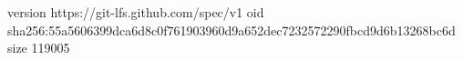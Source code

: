 version https://git-lfs.github.com/spec/v1
oid sha256:55a5606399dca6d8c0f761903960d9a652dec7232572290fbcd9d6b13268bc6d
size 119005
